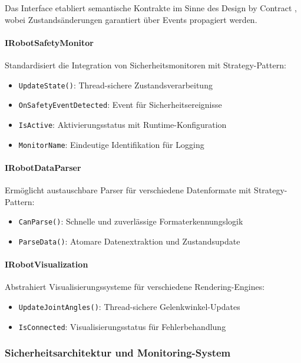 Das Interface etabliert semantische Kontrakte im Sinne des Design by Contract
\cite{Meyer1992}, wobei Zustandsänderungen garantiert über Events propagiert
werden.

\paragraph{IRobotSafetyMonitor}
Standardisiert die Integration von Sicherheitsmonitoren mit Strategy-Pattern:
\begin{itemize}
    \item \texttt{UpdateState()}: Thread-sichere Zustandsverarbeitung
    \item \texttt{OnSafetyEventDetected}: Event für Sicherheitsereignisse
    \item \texttt{IsActive}: Aktivierungsstatus mit Runtime-Konfiguration
    \item \texttt{MonitorName}: Eindeutige Identifikation für Logging
\end{itemize}

\paragraph{IRobotDataParser}
Ermöglicht austauschbare Parser für verschiedene Datenformate mit
Strategy-Pattern:
\begin{itemize}
    \item \texttt{CanParse()}: Schnelle und zuverlässige Formaterkennungslogik
    \item \texttt{ParseData()}: Atomare Datenextraktion und Zustandsupdate
\end{itemize}

\paragraph{IRobotVisualization}
Abstrahiert Visualisierungssysteme für verschiedene Rendering-Engines:
\begin{itemize}
    \item \texttt{UpdateJointAngles()}: Thread-sichere Gelenkwinkel-Updates
    \item \texttt{IsConnected}: Visualisierungsstatus für Fehlerbehandlung
\end{itemize}

\subsubsection{Sicherheitsarchitektur und Monitoring-System}

